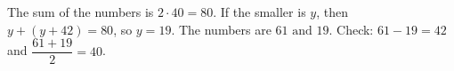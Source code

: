 The sum of the numbers is $2\cdot40=80$. If the smaller is $y$, then $y+(y+42)=80$, so $y=19$. The numbers are $\boxed{61\text{ and }19}$. Check: $61-19=42$ and $\dfrac{61+19}{2}=40$.

